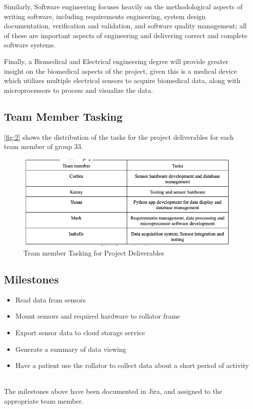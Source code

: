 \documentclass{article}
\begin{document}
Similarly, Software engineering focuses heavily on the methodological aspects of writing software, including requirements engineering, system design documentation, verification and validation, and software quality management; all of these are important aspects of engineering and delivering correct and complete software  systems.  

Finally, a Biomedical and Electrical engineering degree will provide greater insight on the biomedical aspects of the project, given this is a medical device which utilizes multiple electrical sensors to acquire biomedical data, along with microprocessors to process and visualize the data.




\subsection{Team Member Tasking}
\autoref{fig:2} shows the distribution of the tasks for the project deliverables for each team member of group 33. 

\begin{figure}[!h]
    \centering
    \includegraphics[width=0.8\columnwidth]{sysc4907_team_member_tasking.png}
    \caption{Team member Tasking for Project Deliverables}
    \label{fig:2}
\end{figure}

\subsection{Milestones}
\begin{itemize}
    \item Read data from sensors
    \item Mount sensors and required hardware to rollator frame
    \item  Export sensor data to cloud storage service
    \item Generate a summary of data viewing
    \item Have a patient use the rollator to collect data about a short period of activity
\end{itemize} \\
The milestones above have been documented in Jira, and assigned to the appropriate team member. \\ \\
\end{document}
